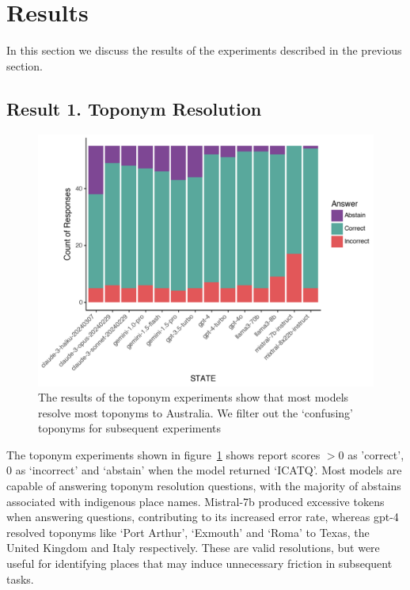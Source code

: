 \section{Results}
\label{section:results}

In this section we discuss the results of the experiments described in the previous section.


\subsection{Result 1. Toponym Resolution}

\begin{figure}
    \centering
    \includegraphics[width=\columnwidth]{figures/toponym_bar_state}
    \caption{The results of the toponym experiments show that most models resolve most toponyms to Australia. We filter out the `confusing' toponyms for subsequent experiments}
    \label{fig:toponym}
\end{figure}

The toponym experiments shown in figure~\ref{fig:toponym} shows report scores $>0$ as 'correct', $0$ as `incorrect' and `abstain' when the model returned `ICATQ'. 
Most models are capable of answering toponym resolution questions, with the majority of abstains associated with indigenous place names. 
Mistral-7b produced excessive tokens when answering questions, contributing to its increased error rate, whereas gpt-4 resolved toponyms like `Port Arthur', `Exmouth' and `Roma' to Texas, the United Kingdom and Italy respectively.
These are valid resolutions, but were useful for identifying places that may induce unnecessary friction in subsequent tasks.

